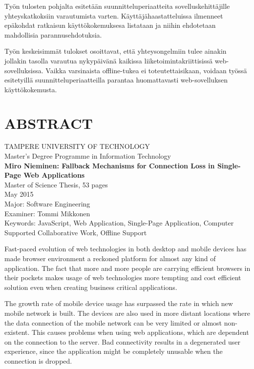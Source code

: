 Työn tulosten pohjalta esitetään suunnitteluperiaatteita sovelluskehittäjille yh\-te\-ys\-kat\-kok\-siin varautumista varten. Käyttäjähaastatteluissa ilmenneet epäkohdat ratkaisun käyttökokemuksesa listataan ja niihin ehdotetaan mahdollisia pa\-ran\-nus\-eh\-do\-tuk\-si\-a.

Työn keskeisimmät tulokset osoittavat, että yhteysongelmiin tulee ainakin jollakin tasolla varautua nykypäivänä kaikissa liiketoimintakriittisissä web-sovelluksissa. Vaikka varsinaista offline-tukea ei toteutettaisikaan, voidaan työssä esitetyillä suunnitteluperiaatteilla parantaa huomattavasti web-sovelluksen käyttökokemusta.






\newpage
\chapter*{ABSTRACT}
\begin{spacing}{1.0}
\textsf{TAMPERE UNIVERSITY OF TECHNOLOGY}\\
\textsf{Master's Degree Programme in Information Technology}\\
{\bf \textsf{Miro Nieminen: Fallback Mechanisms for Connection Loss in Single-Page Web Applications}}\\
\textsf{Master of Science Thesis, 53 pages}\\
\textsf{May 2015}\\
\textsf{Major: Software Engineering}\\
\textsf{Examiner: Tommi Mikkonen}\\
\textsf{Keywords: JavaScript, Web Application, Single-Page Application, Computer Supported Collaborative Work, Offline Support}\\
\end{spacing}
 
Fast-paced evolution of web technologies in both desktop and mobile devices has made browser environment a reckoned platform for almost any kind of application. The fact that more and more people are carrying efficient browsers in their pockets makes usage of web technologies more tempting and cost efficient solution even when creating business critical applications.

The growth rate of mobile device usage has surpassed the rate in which new mobile network is built. The devices are also used in more distant locations where the data connection of the mobile network can be very limited or almost non-existent. This causes problems when using web applications, which are dependent on the connection to the server. Bad connectivity results in a degenerated user experience, since the application might be completely unusable when the connection is dropped.

